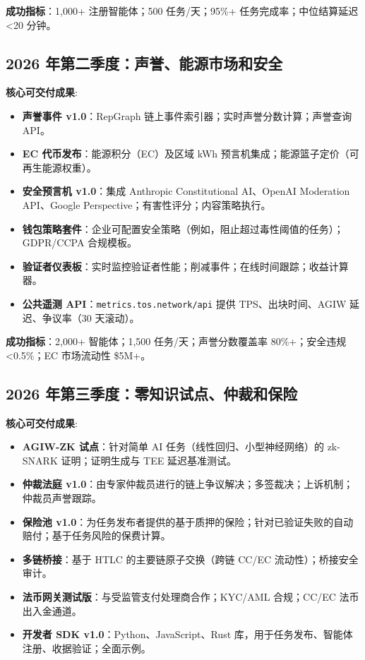 \documentclass[11pt]{article}
\begin{document}
\textbf{成功指标}：1,000+ 注册智能体；500 任务/天；95\%+ 任务完成率；中位结算延迟 <20 分钟。

\subsection{2026 年第二季度：声誉、能源市场和安全}

\textbf{核心可交付成果}:
\begin{itemize}[noitemsep]
  \item \textbf{声誉事件 v1.0}：RepGraph 链上事件索引器；实时声誉分数计算；声誉查询 API。
  \item \textbf{EC 代币发布}：能源积分（EC）及区域 kWh 预言机集成；能源篮子定价（可再生能源权重）。
  \item \textbf{安全预言机 v1.0}：集成 Anthropic Constitutional AI、OpenAI Moderation API、Google Perspective；有害性评分；内容策略执行。
  \item \textbf{钱包策略套件}：企业可配置安全策略（例如，阻止超过毒性阈值的任务）；GDPR/CCPA 合规模板。
  \item \textbf{验证者仪表板}：实时监控验证者性能；削减事件；在线时间跟踪；收益计算器。
  \item \textbf{公共遥测 API}：\texttt{metrics.tos.network/api} 提供 TPS、出块时间、AGIW 延迟、争议率（30 天滚动）。
\end{itemize}

\textbf{成功指标}：2,000+ 智能体；1,500 任务/天；声誉分数覆盖率 80\%+；安全违规 <0.5\%；EC 市场流动性 \$5M+。

\subsection{2026 年第三季度：零知识试点、仲裁和保险}

\textbf{核心可交付成果}:
\begin{itemize}[noitemsep]
  \item \textbf{AGIW-ZK 试点}：针对简单 AI 任务（线性回归、小型神经网络）的 zk-SNARK 证明；证明生成与 TEE 延迟基准测试。
  \item \textbf{仲裁法庭 v1.0}：由专家仲裁员进行的链上争议解决；多签裁决；上诉机制；仲裁员声誉跟踪。
  \item \textbf{保险池 v1.0}：为任务发布者提供的基于质押的保险；针对已验证失败的自动赔付；基于任务风险的保费计算。
  \item \textbf{多链桥接}：基于 HTLC 的主要链原子交换（跨链 CC/EC 流动性）；桥接安全审计。
  \item \textbf{法币网关测试版}：与受监管支付处理商合作；KYC/AML 合规；CC/EC 法币出入金通道。
  \item \textbf{开发者 SDK v1.0}：Python、JavaScript、Rust 库，用于任务发布、智能体注册、收据验证；全面示例。
\end{itemize}
\end{document}

